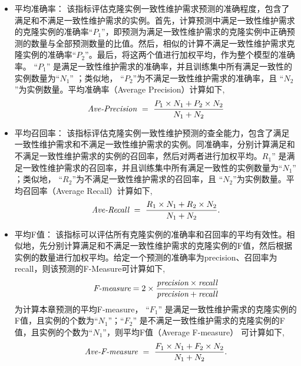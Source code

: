 \begin{itemize}
\item
{平均准确率：} 该指标评估克隆实例一致性维护需求预测的准确程度，包含了满足和不满足一致性维护需求的实例。首先，计算预测中满足一致性维护需求的克隆实例的准确率``$P_1$''，即预测为满足一致性维护需求的克隆实例中正确预测的数量与全部预测数量的比值。然后，相似的计算不满足一致性维护需求克隆实例的准确率``$P_2$''。最后，将这两个值进行加权平均，作为整个模型的准确率。 ``$P_1$'' 是满足一致性维护需求的准确率，并且训练集中所有满足一致性的实例数量为``$N_1$'' ；类似地， ``$P_2$''为不满足一致性维护需求的准确率，且 ``$N_2$''为实例数量。平均准确率（Average Precision）计算如下,
\[
\mbox{\it Ave-Precision} ~=~ {\frac {P_1 \times N_1 + P_2 \times N_2}{N_1 + N_2}}
\]
\item
{平均召回率：} 该指标评估克隆实例一致性维护预测的查全能力，包含了满足一致性维护需求和不满足一致性维护需求的实例。同准确率，分别计算满足和不满足一致性维护需求的实例的召回率，然后对两者进行加权平均。$R_1$'' 是满足一致性维护需求的召回率，并且训练集中所有满足一致性的实例数量为``$N_1$'' ；类似地， ``$R_2$''为不满足一致性维护需求的召回率，且 ``$N_2$''为实例数量。平均召回率（Average Recall）计算如下,
\[
\mbox{\it Ave-Recall} ~=~ {\frac  {R_1 \times N_1 + R_2 \times N_2}{N_1 + N_2}}.
\]

\item
{平均F值：} 该指标可以评估所有克隆实例的准确率和召回率的平均有效性。相似地，先分别计算满足和不满足一致性维护需求的克隆实例的F值，然后根据实例的数量进行加权平均。给定一个预测的准确率为precision、召回率为 recall，则该预测的F-Measure可计算如下,
\[  
\mbox{\it F-measure} =2 \times {\frac {\mbox{\it precision} \times \mbox{\it recall} }{ \mbox{\it precision} + \mbox{\it recall} } }
\]
为计算本章预测的平均F-measure， ``$F_1$'' 是满足一致性维护需求的克隆实例的F值，且实例的个数为``$N_1$''；``$F_2$'' 是不满足一致性维护需求的克隆实例的F值，且实例的个数为``$N_1$''，则平均F值（Average F-measure） 可计算如下,
\[
\mbox{\it Ave-F-measure} ~=~ {\frac  {F_1 \times N_1 + F_2 \times N_2}{N_1 + N_2}}.
\]
\end{itemize}

